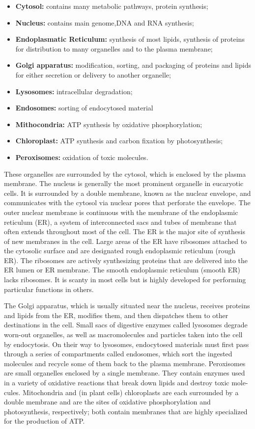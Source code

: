 \begin{itemize}
\item \textbf{Cytosol:} contains many metabolic pathways, protein synthesis;
\item \textbf{Nucleus:} contains main genome,DNA and RNA synthesis;
\item \textbf{Endoplasmatic Reticulum:} synthesis of most lipids, synthesis of proteins 
for distribution to many organelles and to the plasma membrane;
\item \textbf{Golgi apparatus:} modification, sorting, and packaging of proteins and 
lipids for either secretion or delivery to another organelle;
\item \textbf{Lysosomes:} intracellular degradation;
\item \textbf{Endosomes:} sorting of endocytosed material
\item \textbf{Mithocondria:} ATP synthesis by oxidative phosphorylation;
\item \textbf{Chloroplast:} ATP synthesis and carbon fixation by photosynthesis;
\item \textbf{Peroxisomes:} oxidation of toxic molecules.
\end{itemize}

These organelles are surrounded by the cytosol, which is enclosed by the
plasma membrane. The nucleus is generally the most prominent organelle
in eucaryotic cells. It is surrounded by a double membrane, known as the
nuclear envelope, and communicates with the cytosol via nuclear pores
that perforate the envelope. The outer nuclear membrane is continuous
with the membrane of the endoplasmic reticulum (ER), a system of interconnected 
sacs and tubes of membrane that often extends throughout
most of the cell. The ER is the major site of synthesis of new membranes
in the cell. Large areas of the ER have ribosomes attached to the cytosolic
surface and are designated rough endoplasmic reticulum (rough ER). The
ribosomes are actively synthesizing proteins that are delivered into the
ER lumen or ER membrane. The smooth endoplasmic reticulum (smooth
ER) lacks ribosomes. It is scanty in most cells but is highly developed
for performing particular functions in others.

The Golgi apparatus, which is usually situated near the nucleus, receives
proteins and lipids from the ER, modifies them, and then dispatches them
to other destinations in the cell. Small sacs of digestive enzymes called
lysosomes degrade worn-out organelles, as well as macromolecules and
particles taken into the cell by endocytosis. On their way to lysosomes,
endocytosed materials must first pass through a series of compartments
called endosomes, which sort the ingested molecules and recycle some of
them back to the plasma membrane. Peroxisomes are small organelles
enclosed by a single membrane. They contain enzymes used in a variety
of oxidative reactions that break down lipids and destroy toxic mole-
cules. Mitochondria and (in plant cells) chloroplasts are each surrounded
by a double membrane and are the sites of oxidative phosphorylation
and photosynthesis, respectively; both contain
membranes that are highly specialized for the production of ATP.

